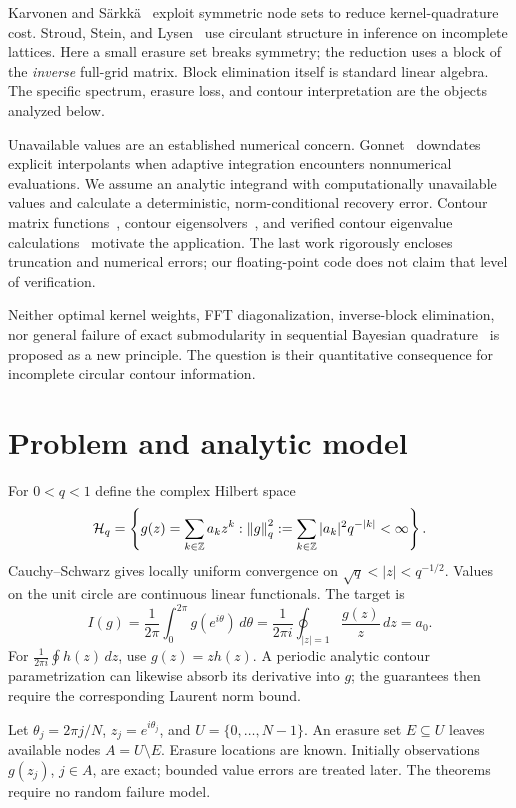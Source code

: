 \documentclass[11pt]{article}
\newcommand{\Hq}{\mathcal H_q}\newcommand{\E}{\mathcal E}
\begin{document}
Karvonen and S\"arkk\"a~\cite{KS18} exploit symmetric node sets to reduce kernel-quadrature cost. Stroud, Stein, and Lysen~\cite{SSL17} use circulant structure in inference on incomplete lattices. Here a small erasure set breaks symmetry; the reduction uses a block of the \emph{inverse} full-grid matrix. Block elimination itself is standard linear algebra. The specific spectrum, erasure loss, and contour interpretation are the objects analyzed below.

Unavailable values are an established numerical concern. Gonnet~\cite{Gonnet10} downdates explicit interpolants when adaptive integration encounters nonnumerical evaluations. We assume an analytic integrand with computationally unavailable values and calculate a deterministic, norm-conditional recovery error. Contour matrix functions~\cite{HHT08}, contour eigensolvers~\cite{SS03}, and verified contour eigenvalue calculations~\cite{IMT20} motivate the application. The last work rigorously encloses truncation and numerical errors; our floating-point code does not claim that level of verification.

Neither optimal kernel weights, FFT diagonalization, inverse-block elimination, nor general failure of exact submodularity in sequential Bayesian quadrature~\cite{HD12} is proposed as a new principle. The question is their quantitative consequence for incomplete circular contour information.

\section{Problem and analytic model}
For $0<q<1$ define the complex Hilbert space
\begin{equation}
\Hq=\left\{g(z)=\sum_{k\in\mathbb Z}a_kz^k:
\norm g_q^2:=\sum_{k\in\mathbb Z}|a_k|^2q^{-|k|}<\infty\right\}.
\label{eq:space}
\end{equation}
Cauchy--Schwarz gives locally uniform convergence on $\sqrt q<|z|<q^{-1/2}$. Values on the unit circle are continuous linear functionals. The target is
\begin{equation}
I(g)=\frac1{2\pi}\int_0^{2\pi}g(e^{i\theta})\,d\theta
=\frac1{2\pi i}\oint_{|z|=1}\frac{g(z)}z\,dz=a_0.
\label{eq:target}
\end{equation}
For $\frac1{2\pi i}\oint h(z)\,dz$, use $g(z)=zh(z)$. A periodic analytic contour parametrization can likewise absorb its derivative into $g$; the guarantees then require the corresponding Laurent norm bound.

Let $\theta_j=2\pi j/N$, $z_j=e^{i\theta_j}$, and $U=\{0,\ldots,N-1\}$. An erasure set $E\subseteq U$ leaves available nodes $A=U\setminus E$. Erasure locations are known. Initially observations $g(z_j)$, $j\in A$, are exact; bounded value errors are treated later. The theorems require no random failure model.
\end{document}
